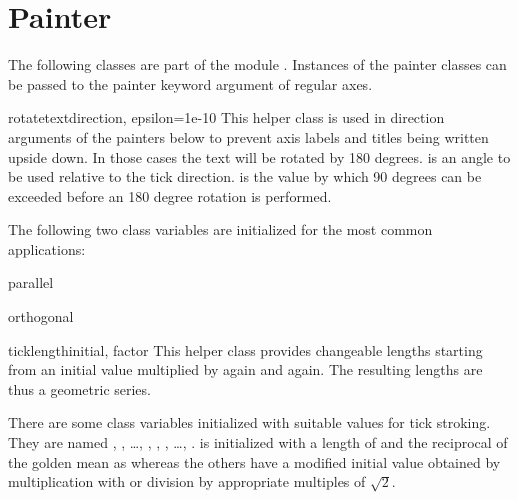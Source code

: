\section{Painter}


The following classes are part of the module
. Instances of the painter classes can be
passed to the painter keyword argument of regular axes.

\begin{classdesc}{rotatetext}{direction, epsilon=1e-10}
  This helper class is used in direction arguments of the painters
  below to prevent axis labels and titles being written upside down.
  In those cases the text will be rotated by 180 degrees.
   is an angle to be used relative to the tick
  direction.  is the value by which 90 degrees can be
  exceeded before an 180 degree rotation is performed.
\end{classdesc}

The following two class variables are initialized for the most common
applications:

\begin{memberdesc}{parallel}
\end{memberdesc}

\begin{memberdesc}{orthogonal}
\end{memberdesc}

\begin{classdesc}{ticklength}{initial, factor}
  This helper class provides changeable \PyX{} lengths starting from
  an initial value  multiplied by  again and
  again. The resulting lengths are thus a geometric series.
\end{classdesc}

There are some class variables initialized with suitable values for
tick stroking. They are named ,
, \dots, ,
, , \dots,
.  is initialized with
a length of  and the reciprocal of the golden mean as
 whereas the others have a modified initial value
obtained by multiplication with or division by appropriate multiples of 
$\sqrt{2}$.

